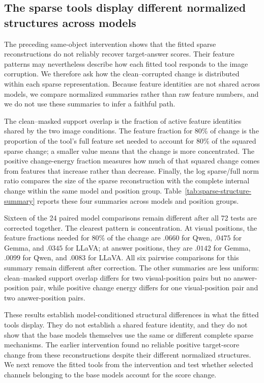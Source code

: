 \subsection{The sparse tools display different normalized structures across models}
\label{sec:sparse-structure}

The preceding same-object intervention shows that the fitted sparse reconstructions do not reliably recover target-answer scores. Their feature patterns may nevertheless describe how each fitted tool responds to the image corruption. We therefore ask how the clean--corrupted change is distributed within each sparse representation. Because feature identities are not shared across models, we compare normalized summaries rather than raw feature numbers, and we do not use these summaries to infer a faithful path.

\begin{samepage}
The clean--masked support overlap is the fraction of active feature identities shared by the two image conditions. The feature fraction for 80\% of change is the proportion of the tool's full feature set needed to account for 80\% of the squared sparse change; a smaller value means that the change is more concentrated. The positive change-energy fraction measures how much of that squared change comes from features that increase rather than decrease. Finally, the log sparse/full norm ratio compares the size of the sparse reconstruction with the complete internal change within the same model and position group. Table~\ref{tab:sparse-structure-summary} reports these four summaries across models and position groups.
\end{samepage}



Sixteen of the 24 paired model comparisons remain different after all 72 tests are corrected together. The clearest pattern is concentration. At visual positions, the feature fractions needed for 80\% of the change are $.0660$ for Qwen, $.0475$ for Gemma, and $.0345$ for LLaVA; at answer positions, they are $.0142$ for Gemma, $.0099$ for Qwen, and $.0083$ for LLaVA. All six pairwise comparisons for this summary remain different after correction. The other summaries are less uniform: clean--masked support overlap differs for two visual-position pairs but no answer-position pair, while positive change energy differs for one visual-position pair and two answer-position pairs.

These results establish model-conditioned structural differences in what the fitted tools display. They do not establish a shared feature identity, and they do not show that the base models themselves use the same or different complete sparse mechanisms. The earlier intervention found no reliable positive target-score change from these reconstructions despite their different normalized structures. We next remove the fitted tools from the intervention and test whether selected channels belonging to the base models account for the score change.

\FloatBarrier
